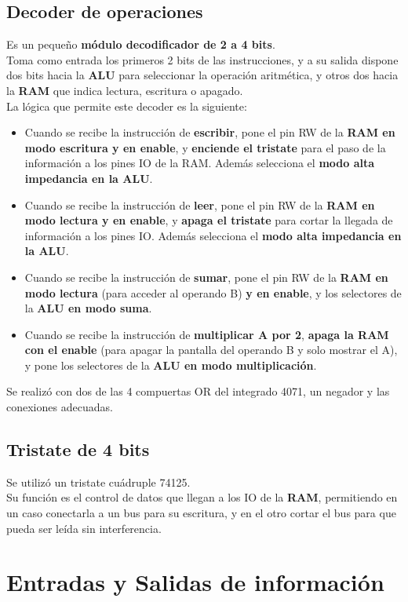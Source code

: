 \documentclass{sciposter}
\begin{document}
\begin{multicols*}{2}
\subsection{Decoder de operaciones}
Es un pequeño \textbf{módulo decodificador de 2 a 4 bits}.\\
Toma como entrada los primeros 2 bits de las instrucciones, y a su salida dispone dos bits hacia la \textbf{ALU} para seleccionar la operación aritmética, y otros dos hacia la \textbf{RAM} que indica lectura, escritura o apagado.\\
La lógica que permite este decoder es la siguiente:
\begin{itemize}
    \item Cuando se recibe la instrucción de \textbf{escribir}, pone el pin RW de la \textbf{RAM en modo escritura y en enable}, y \textbf{enciende el tristate} para el paso de la información a los pines IO de la RAM.
    Además selecciona el \textbf{modo alta impedancia en la ALU}.
    \item Cuando se recibe la instrucción de \textbf{leer}, pone el pin RW de la \textbf{RAM en modo lectura y en enable}, y \textbf{apaga el tristate} para cortar la llegada de información a los pines IO.
    Además selecciona el \textbf{modo alta impedancia en la ALU}.
    \item Cuando se recibe la instrucción de \textbf{sumar}, pone el pin RW de la \textbf{RAM en modo lectura} (para acceder al operando B) \textbf{y en enable}, y los selectores de 
    la \textbf{ALU en modo suma}.
    \item Cuando se recibe la instrucción de \textbf{multiplicar A por 2}, \textbf{apaga la RAM con el enable} (para apagar la pantalla del operando B y solo mostrar el A), y pone los selectores de la  \textbf{ALU en modo multiplicación}.
\end{itemize}
Se realizó con dos de las 4 compuertas OR del integrado 4071, un negador y las conexiones adecuadas.

\subsection{Tristate de 4 bits}
Se utilizó un tristate cuádruple 74125.\\
Su función es el control de datos que llegan a los IO de la \textbf{RAM}, permitiendo en un caso conectarla a un bus para su escritura, y en el otro cortar el bus para que pueda ser leída sin interferencia.

\section{Entradas y Salidas de información}


\end{multicols*}
\end{document}
